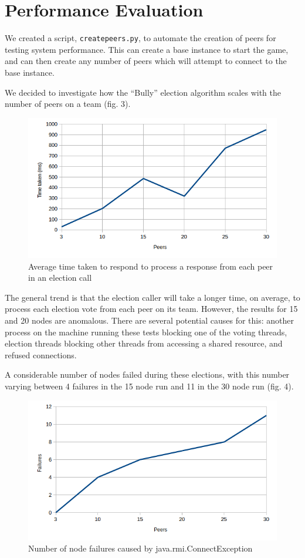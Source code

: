 \documentclass[conference]{IEEEtran}
\begin{document}
\section{Performance Evaluation}
We created a script, \texttt{createpeers.py}, to automate the creation of peers for testing system performance. This can create a base instance to start the game, and can then create any number of peers which will attempt to connect to the base instance.

We decided to investigate how the ``Bully'' election algorithm scales with the number of peers on a team (fig. 3).

\begin{figure}[h]
	\includegraphics[width=\linewidth]{images/election-chart.png}
	\caption{Average time taken to respond to process a response from each peer in an election call}
	\label{fig:election-img}
\end{figure}

The general trend is that the election caller will take a longer time, on average, to process each election vote from each peer on its team. However, the results for 15 and 20 nodes are anomalous. There are several potential causes for this: another process on the machine running these tests blocking one of the voting threads, election threads blocking other threads from accessing a shared resource, and refused connections.

A considerable number of nodes failed during these elections, with this number varying between 4 failures in the 15 node run and 11 in the 30 node run (fig. 4).

\begin{figure}[h]
	\includegraphics[width=\linewidth]{images/failures.png}
	\caption{Number of node failures caused by java.rmi.ConnectException}
	\label{fig:failure-img}
\end{figure}
\end{document}
